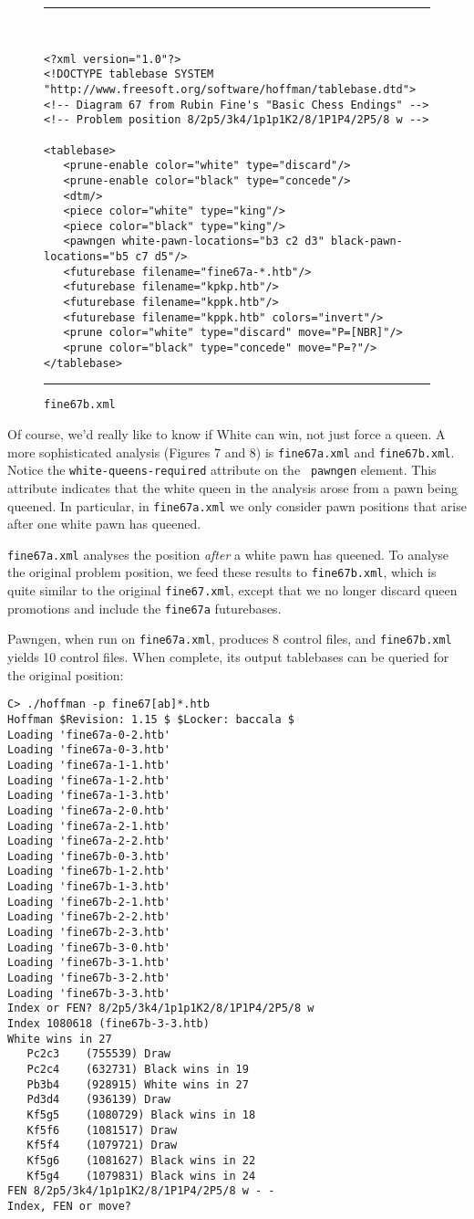 \documentclass[11pt]{article}
\begin{document}
\begin{figure}
\hrule\ 
{\small\begin{verbatim}
<?xml version="1.0"?>
<!DOCTYPE tablebase SYSTEM "http://www.freesoft.org/software/hoffman/tablebase.dtd">
<!-- Diagram 67 from Rubin Fine's "Basic Chess Endings" -->
<!-- Problem position 8/2p5/3k4/1p1p1K2/8/1P1P4/2P5/8 w -->

<tablebase>
   <prune-enable color="white" type="discard"/>
   <prune-enable color="black" type="concede"/>
   <dtm/>
   <piece color="white" type="king"/>
   <piece color="black" type="king"/>
   <pawngen white-pawn-locations="b3 c2 d3" black-pawn-locations="b5 c7 d5"/>
   <futurebase filename="fine67a-*.htb"/>
   <futurebase filename="kpkp.htb"/>
   <futurebase filename="kppk.htb"/>
   <futurebase filename="kppk.htb" colors="invert"/>
   <prune color="white" type="discard" move="P=[NBR]"/>
   <prune color="black" type="concede" move="P=?"/>
</tablebase>
\end{verbatim}}
\hrule
\caption{\tt fine67b.xml}
\end{figure}

Of course, we'd really like to know if White can win, not just force a
queen.  A more sophisticated analysis (Figures 7 and 8) is {\tt fine67a.xml}
and {\tt fine67b.xml}.
Notice the {\tt white-queens-required} attribute on the {\tt
pawngen} element.  This attribute indicates that the white queen
in the analysis arose from a pawn being queened.  In particular,
in {\tt fine67a.xml}
we only consider pawn positions that arise after one white
pawn has queened.

{\tt fine67a.xml} analyses the position {\it after} a white pawn has
queened.  To analyse the original problem position, we feed these
results to {\tt fine67b.xml}, which is quite similar to the original
{\tt fine67.xml}, except that we no longer discard queen promotions
and include the {\tt fine67a} futurebases.

Pawngen, when run on {\tt fine67a.xml}, produces 8 control files, and
{\tt fine67b.xml} yields 10 control files.  When complete, its output
tablebases can be queried for the original position:

\begin{verbatim}
C> ./hoffman -p fine67[ab]*.htb
Hoffman $Revision: 1.15 $ $Locker: baccala $
Loading 'fine67a-0-2.htb'
Loading 'fine67a-0-3.htb'
Loading 'fine67a-1-1.htb'
Loading 'fine67a-1-2.htb'
Loading 'fine67a-1-3.htb'
Loading 'fine67a-2-0.htb'
Loading 'fine67a-2-1.htb'
Loading 'fine67a-2-2.htb'
Loading 'fine67b-0-3.htb'
Loading 'fine67b-1-2.htb'
Loading 'fine67b-1-3.htb'
Loading 'fine67b-2-1.htb'
Loading 'fine67b-2-2.htb'
Loading 'fine67b-2-3.htb'
Loading 'fine67b-3-0.htb'
Loading 'fine67b-3-1.htb'
Loading 'fine67b-3-2.htb'
Loading 'fine67b-3-3.htb'
Index or FEN? 8/2p5/3k4/1p1p1K2/8/1P1P4/2P5/8 w
Index 1080618 (fine67b-3-3.htb)
White wins in 27
   Pc2c3    (755539) Draw
   Pc2c4    (632731) Black wins in 19
   Pb3b4    (928915) White wins in 27
   Pd3d4    (936139) Draw
   Kf5g5    (1080729) Black wins in 18
   Kf5f6    (1081517) Draw
   Kf5f4    (1079721) Draw
   Kf5g6    (1081627) Black wins in 22
   Kf5g4    (1079831) Black wins in 24
FEN 8/2p5/3k4/1p1p1K2/8/1P1P4/2P5/8 w - -
Index, FEN or move? 
\end{verbatim}
\end{document}
